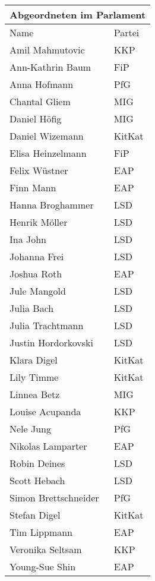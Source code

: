 \documentclass{sasbase}
\begin{document}
\begin{tabular}{ |p{5cm}|p{3cm}| }
 \hline
 \multicolumn{2}{|c|}{Abgeordneten im Parlament} \\
 \hline
 Name & Partei \\
 \hline
Amil Mahmutovic & KKP \\
Ann-Kathrin Baum & FiP\\
Anna Hofmann & PfG\\
Chantal Gliem & MIG\\
Daniel Höfig & MIG\\
Daniel Wizemann & KitKat\\
Elisa Heinzelmann & FiP\\
Felix Wüstner & EAP\\
Finn Mann & EAP\\
Hanna Broghammer & LSD\\
Henrik Möller & LSD\\
Ina John & LSD\\
Johanna Frei & LSD\\
Joshua Roth & EAP\\
Jule Mangold & LSD\\
Julia Bach & LSD\\
Julia Trachtmann & LSD\\
Justin Hordorkovski & LSD\\
Klara Digel & KitKat\\
Lily Timme & KitKat\\
Linnea Betz & MIG\\
Louise Acupanda & KKP\\
Nele Jung & PfG\\
Nikolas Lamparter & EAP\\
Robin Deines & LSD\\
Scott Hebach & LSD\\
Simon Brettschneider & PfG\\
Stefan Digel & KitKat\\
Tim Lippmann & EAP\\
Veronika Seltsam & KKP\\
Young-Sue Shin & EAP\\
 \hline
\end{tabular}
\end{document}
